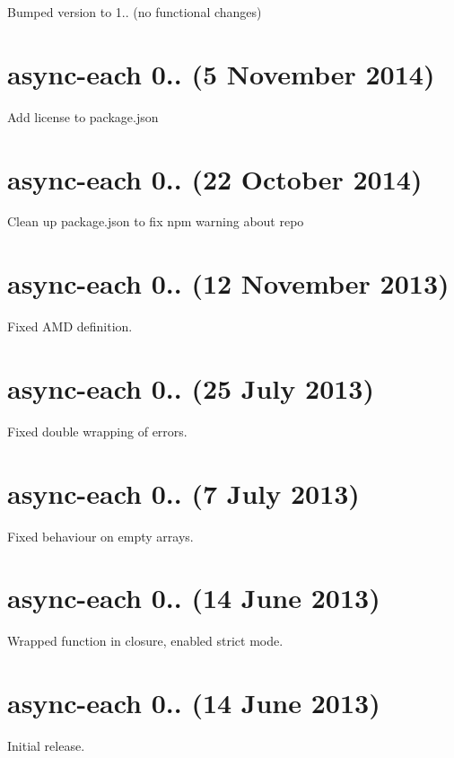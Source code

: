 
\begin{DoxyItemize}
\item Bumped version to 1.. (no functional changes)
\end{DoxyItemize}

\section*{async-\/each 0.. (5 November 2014)}


\begin{DoxyItemize}
\item Add license to package.\+json
\end{DoxyItemize}

\section*{async-\/each 0.. (22 October 2014)}


\begin{DoxyItemize}
\item Clean up package.\+json to fix npm warning about {\ttfamily repo}
\end{DoxyItemize}

\section*{async-\/each 0.. (12 November 2013)}


\begin{DoxyItemize}
\item Fixed A\+MD definition.
\end{DoxyItemize}

\section*{async-\/each 0.. (25 July 2013)}


\begin{DoxyItemize}
\item Fixed double wrapping of errors.
\end{DoxyItemize}

\section*{async-\/each 0.. (7 July 2013)}


\begin{DoxyItemize}
\item Fixed behaviour on empty arrays.
\end{DoxyItemize}

\section*{async-\/each 0.. (14 June 2013)}


\begin{DoxyItemize}
\item Wrapped function in closure, enabled strict mode.
\end{DoxyItemize}

\section*{async-\/each 0.. (14 June 2013)}


\begin{DoxyItemize}
\item Initial release. 
\end{DoxyItemize}